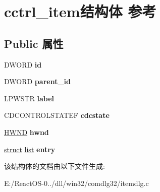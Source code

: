 \hypertarget{structcctrl__item}{}\section{cctrl\+\_\+item结构体 参考}
\label{structcctrl__item}
\subsection*{Public 属性}
\begin{DoxyCompactItemize}
\item 
\mbox{\label{structcctrl__item_a2e628bb065541a947017b5089359891c}} 
D\+W\+O\+RD {\bfseries id}
\item 
\mbox{\label{structcctrl__item_a8048f5a5550f95139dce3d61336b780f}} 
D\+W\+O\+RD {\bfseries parent\+\_\+id}
\item 
\mbox{\label{structcctrl__item_aa291b6b9d597496e7e7c2ae110552a28}} 
L\+P\+W\+S\+TR {\bfseries label}
\item 
\mbox{\label{structcctrl__item_af022c05caeb8b47ecc5632b0cede45a7}} 
C\+D\+C\+O\+N\+T\+R\+O\+L\+S\+T\+A\+T\+EF {\bfseries cdcstate}
\item 
\mbox{\label{structcctrl__item_ab93387acf5171df6ee98a0caae159ee0}} 
\hyperlink{interfacevoid}{H\+W\+ND} {\bfseries hwnd}
\item 
\mbox{\label{structcctrl__item_a7e678e06ef51bf58d33639af7639ef02}} 
\hyperlink{interfacestruct}{struct} \hyperlink{classlist}{list} {\bfseries entry}
\end{DoxyCompactItemize}


该结构体的文档由以下文件生成\+:\begin{DoxyCompactItemize}
\item 
E\+:/\+React\+O\+S-\/0../dll/win32/comdlg32/itemdlg.\+c\end{DoxyCompactItemize}

